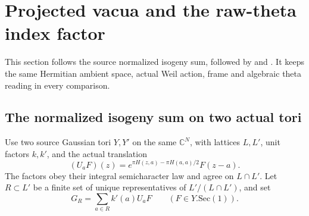 \section{Projected vacua and the raw-theta index factor}
\label{sec:sr-source-raw-theta-norm}
This section follows the source normalized isogeny sum, followed
by  and
.
It keeps the same Hermitian ambient space, actual Weil action,
frame and algebraic theta reading in every comparison.

\subsection{The normalized isogeny sum on two actual tori}
Use two source Gaussian tori \(Y,Y'\) on the same
\(\mathbb C^N\), with lattices \(L,L'\), unit factors \(k,k'\),
and the actual translation
\[
 (U_aF)(z)=
       e^{\pi H(z,a)-\pi H(a,a)/2}F(z-a).
 \tag{RV1}\label{eq:sr-source-fock-translation}
\]
The factors obey their integral semicharacter law and agree on
\(L\cap L'\).
Let \(R\subset L'\) be a finite set of unique representatives
of \(L'/(L\cap L')\), and set
\[
                     G_R=\sum_{a\in R}k'(a)U_aF
                                      \qquad(F\in Y.\mathrm{Sec}(1)).
 \tag{RV2}\label{eq:sr-source-isogeny-sum}
\]


